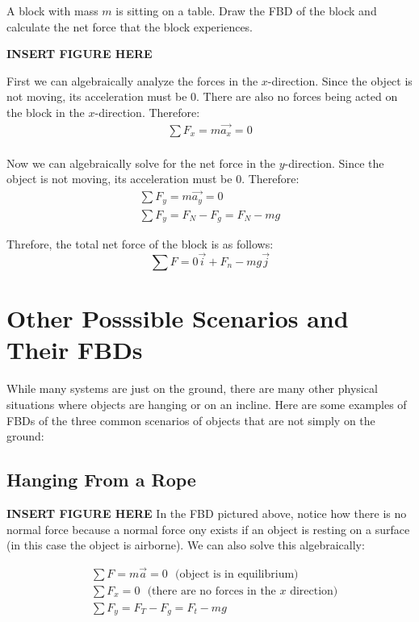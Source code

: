 \begin{problem}
	A block with mass $m$ is sitting on a table. Draw the FBD of the block and calculate the net force that the block experiences.

	\textbf{INSERT FIGURE HERE}

	First we can algebraically analyze the forces in the $x$-direction. Since the object is not moving, its acceleration must be 0. There are also no forces being acted on the block in the $x$-direction. Therefore:
	$$
		\begin{aligned}
			\sum F_x = m\vec{a_x} = 0\\
		\end{aligned}
	$$

	Now we can algebraically solve for the net force in the $y$-direction. Since the object is not moving, its acceleration must be 0. Therefore:
	$$
		\begin{aligned}
			\sum F_y = m\vec{a_y} = 0\\
			\sum F_y = F_N - F_g = F_N - mg
		\end{aligned}
	$$

	Threfore, the total net force of the block is as follows:
	$$
		\sum F = 0\vec{i} + F_n-mg \vec{j}
	$$
\end{problem}


\section{Other Posssible Scenarios and Their FBDs}

While many systems are just on the ground, there are many other physical situations where objects are hanging or on an incline. Here are some examples of FBDs of the three common scenarios of objects that are not simply on the ground:

\subsection*{Hanging From a Rope}

\textbf{INSERT FIGURE HERE}
In the FBD pictured above, notice how there is no normal force because a normal force ony exists if an object is resting on a surface (in this case the object is airborne). We can also solve this algebraically:

$$
	\begin{aligned}
		&\sum F = m\vec{a} = 0 \:\:\:\text{(object is in equilibrium)}\\
		&\sum F_x = 0 \:\:\:\text{(there are no forces in the $x$ direction)}\\
		&\sum F_y = F_T - F_g = F_t - mg
	\end{aligned}
$$

